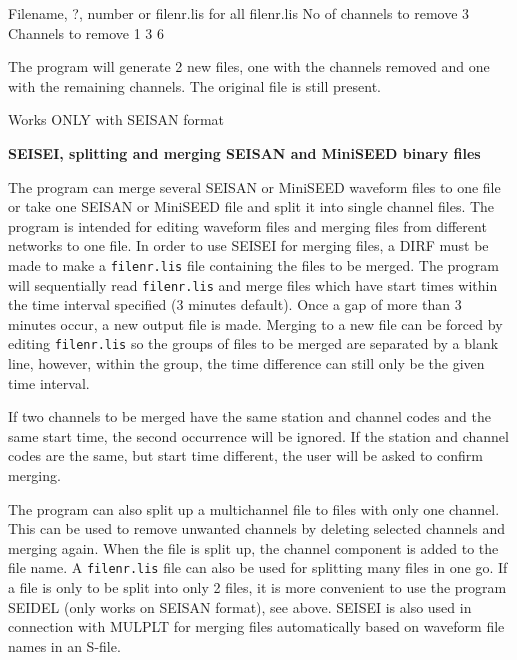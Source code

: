 \begin{boxedverbatim}

 Filename, ?, number or filenr.lis for all
 filenr.lis
 No of channels to remove
 3
 Channels to remove
 1 3 6 

\end{boxedverbatim}

The program will generate 2 new files, one with the channels removed and one with the remaining channels. The original file is still present. 

Works ONLY with SEISAN format 

\textbf{SEISEI, splitting and merging SEISAN and MiniSEED binary files}

The program can merge several SEISAN or MiniSEED waveform files to one file or take one SEISAN or MiniSEED file and split it into single channel files. The program is intended for editing waveform files and merging files from different networks to one file. In order to use SEISEI for merging files, a DIRF must be made to make a \texttt{filenr.lis} file containing the files to be merged. The program will sequentially read \texttt{filenr.lis} and merge files which have start times within the time interval specified (3 minutes default). Once a gap of more than 3 minutes occur, a new output file is made. Merging to a new file can be forced by editing \texttt{filenr.lis} so the groups of files to be merged are separated by a blank line, however, within the group, the time difference can still only be the given time interval.  

If two channels to be merged have the same station and channel codes and the same start time, the second occurrence will be ignored. If the station and channel codes are the same, but start time different, the user will be asked to confirm merging. 

The program can also split up a multichannel file to files with only one channel. This can be used to remove unwanted channels by deleting selected channels and merging again. When the file is split up, the channel component is added to the file name. A \texttt{filenr.lis} file can also be used for splitting many files in one go. If a file is only to be split into only 2 files, it is more convenient to use the program SEIDEL (only works on SEISAN format), see above. SEISEI is also used in connection with MULPLT for merging files automatically based on waveform file names in an S-file. 


